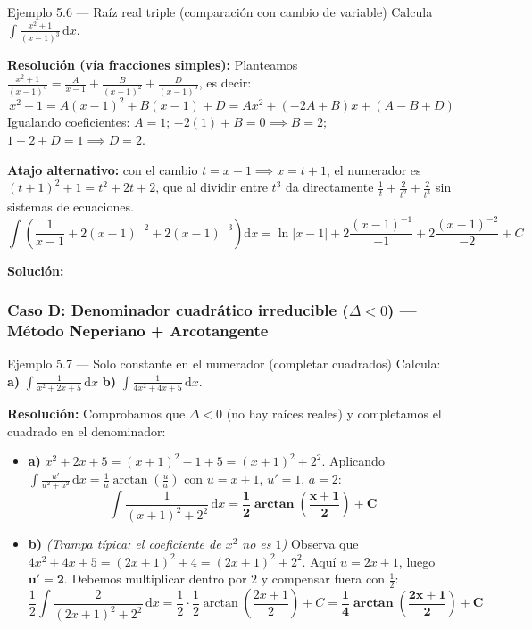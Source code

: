 \documentclass[10pt,a4paper]{article}
\newcommand{\sol}[1]{\par\smallskip\noindent\textbf{Solución:} \fcolorbox{mainblue}{softblue}{$\displaystyle #1$}}
\begin{document}
\begin{ejemplobox}{Ejemplo 5.6 --- Raíz real triple (comparación con cambio de variable)}
Calcula $\displaystyle \int \frac{x^2 + 1}{(x - 1)^3}\,\mathrm{d}x$.
\par\textbf{Resolución (vía fracciones simples):} Planteamos $\displaystyle \frac{x^2+1}{(x-1)^3} = \frac{A}{x-1} + \frac{B}{(x-1)^2} + \frac{D}{(x-1)^3}$, es decir:
$$x^2 + 1 = A(x - 1)^2 + B(x - 1) + D = A x^2 + (-2A + B)x + (A - B + D)$$
Igualando coeficientes: $A = 1$; $-2(1) + B = 0 \implies B = 2$; $1 - 2 + D = 1 \implies D = 2$.
\par\textbf{Atajo alternativo:} con el cambio $t = x - 1 \implies x = t + 1$, el numerador es $(t+1)^2+1 = t^2+2t+2$, que al dividir entre $t^3$ da directamente $\frac{1}{t} + \frac{2}{t^2} + \frac{2}{t^3}$ sin sistemas de ecuaciones.
$$\int \left(\frac{1}{x - 1} + 2(x - 1)^{-2} + 2(x - 1)^{-3}\right)\mathrm{d}x = \ln|x - 1| + 2\frac{(x-1)^{-1}}{-1} + 2\frac{(x-1)^{-2}}{-2} + C$$
\sol{\ln|x - 1| - \frac{2}{x - 1} - \frac{1}{(x - 1)^2} + C}
\end{ejemplobox}

\subsubsection{Caso D: Denominador cuadrático irreducible ($\Delta < 0$) --- Método Neperiano + Arcotangente}

\begin{ejemplobox}{Ejemplo 5.7 --- Solo constante en el numerador (completar cuadrados)}
Calcula: \quad \textbf{a)} $\displaystyle \int \frac{1}{x^2 + 2x + 5}\,\mathrm{d}x$ \qquad \textbf{b)} $\displaystyle \int \frac{1}{4x^2 + 4x + 5}\,\mathrm{d}x$.
\par\textbf{Resolución:} Comprobamos que $\Delta < 0$ (no hay raíces reales) y completamos el cuadrado en el denominador:
\begin{itemize}\itemsep 3pt
  \item \textbf{a)} $x^2 + 2x + 5 = (x + 1)^2 - 1 + 5 = (x + 1)^2 + 2^2$. Aplicando $\int \frac{u'}{u^2 + a^2}\,\mathrm{d}x = \frac{1}{a}\arctan\!\left(\frac{u}{a}\right)$ con $u = x + 1$, $u' = 1$, $a = 2$:
  $$\int \frac{1}{(x + 1)^2 + 2^2}\,\mathrm{d}x = \mathbf{\frac{1}{2}\arctan\!\left(\frac{x + 1}{2}\right) + C}$$
  \item \textbf{b)} \textit{(Trampa típica: el coeficiente de $x^2$ no es $1$)} Observa que $4x^2 + 4x + 5 = (2x + 1)^2 + 4 = (2x + 1)^2 + 2^2$. Aquí $u = 2x + 1$, luego $\mathbf{u' = 2}$. Debemos multiplicar dentro por $2$ y compensar fuera con $\frac{1}{2}$:
  $$\frac{1}{2}\int \frac{2}{(2x + 1)^2 + 2^2}\,\mathrm{d}x = \frac{1}{2}\cdot\frac{1}{2}\arctan\!\left(\frac{2x + 1}{2}\right) + C = \mathbf{\frac{1}{4}\arctan\!\left(\frac{2x + 1}{2}\right) + C}$$
\end{itemize}
\end{ejemplobox}
\end{document}
